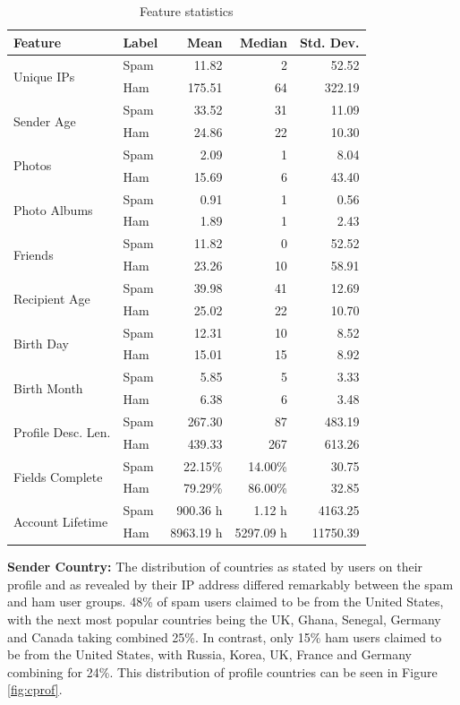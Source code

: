 \documentclass[preprint]{acm_proc_article-sp}
\begin{document}
\begin{table}
\begin{tabular}{|l|l|r|r|r|}
    \hline
    \textbf{Feature} & \textbf{Label} & \textbf{Mean} & \textbf{Median} & \textbf{Std. Dev.}\\
    \hline
    \multirow{2}{*}{Unique IPs} & Spam & 11.82 & 2 & 52.52\\
    & Ham & 175.51 & 64 & 322.19\\
    \hline
    \multirow{2}{*}{Sender Age} & Spam & 33.52 & 31 & 11.09\\
    & Ham & 24.86 & 22 & 10.30\\
    \hline
    \multirow{2}{*}{Photos} & Spam & 2.09 & 1 & 8.04\\
    & Ham & 15.69 & 6 & 43.40\\
    \hline
    \multirow{2}{*}{Photo Albums} & Spam & 0.91 & 1 & 0.56\\
    & Ham & 1.89 & 1 & 2.43\\
    \hline
    \multirow{2}{*}{Friends} & Spam & 11.82 & 0 & 52.52\\
    & Ham & 23.26 & 10 & 58.91\\
    \hline
    \multirow{2}{*}{Recipient Age} & Spam & 39.98 & 41 & 12.69\\
    & Ham & 25.02 & 22 & 10.70\\
    \hline
    \multirow{2}{*}{Birth Day} & Spam & 12.31 & 10 & 8.52\\
    & Ham & 15.01 & 15 & 8.92\\
    \hline
    \multirow{2}{*}{Birth Month} & Spam & 5.85 & 5 & 3.33\\
    & Ham & 6.38 & 6 & 3.48\\
    \hline
    \multirow{2}{*}{Profile Desc. Len.} & Spam & 267.30 & 87 & 483.19\\
    & Ham & 439.33 & 267 & 613.26\\
    \hline
    \multirow{2}{*}{Fields Complete} & Spam & 22.15\% & 14.00\% & 30.75\\
    & Ham & 79.29\% & 86.00\% & 32.85\\
    \hline
    \multirow{2}{*}{Account Lifetime} & Spam & 900.36 h & 1.12 h & 4163.25\\
    & Ham & 8963.19 h & 5297.09 h & 11750.39 \\
    \hline
\end{tabular}
\caption{Feature statistics}
\label{tab:feats}
\end{table}

\textbf{Sender Country:} The distribution of countries as stated by users on their profile and as 
revealed by their IP address differed remarkably between the spam and ham user groups. 
48\% of spam users claimed to be from the United States, with the next most popular 
countries being the UK, Ghana, Senegal, Germany and Canada taking combined 25\%. 
In contrast, only 15\% ham users claimed to be from the United States, with Russia, 
Korea, UK, France and Germany combining for 24\%. This distribution of profile countries can 
be seen in Figure \ref{fig:cprof}.
\end{document}
